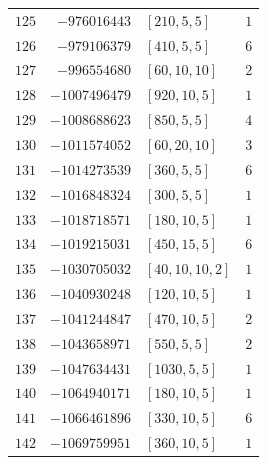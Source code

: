 \documentclass[11pt]{article}
\begin{document}
\begin{center}
\begin{longtable}{r r l c}
$125$ & $-976016443$ & $[210,5,5]$ & $1$\\
$126$ & $-979106379$ & $[410,5,5]$ & $6$\\
$127$ & $-996554680$ & $[60,10,10]$ & $2$\\
$128$ & $-1007496479$ & $[920,10,5]$ & $1$\\
$129$ & $-1008688623$ & $[850,5,5]$ & $4$\\
$130$ & $-1011574052$ & $[60,20,10]$ & $3$\\
$131$ & $-1014273539$ & $[360,5,5]$ & $6$\\
$132$ & $-1016848324$ & $[300,5,5]$ & $1$\\
$133$ & $-1018718571$ & $[180,10,5]$ & $1$\\
$134$ & $-1019215031$ & $[450,15,5]$ & $6$\\
$135$ & $-1030705032$ & $[40,10,10,2]$ & $1$\\
$136$ & $-1040930248$ & $[120,10,5]$ & $1$\\
$137$ & $-1041244847$ & $[470,10,5]$ & $2$\\
$138$ & $-1043658971$ & $[550,5,5]$ & $2$\\
$139$ & $-1047634431$ & $[1030,5,5]$ & $1$\\
$140$ & $-1064940171$ & $[180,10,5]$ & $1$\\
$141$ & $-1066461896$ & $[330,10,5]$ & $6$\\
$142$ & $-1069759951$ & $[360,10,5]$ & $1$\\
\end{longtable}
\end{center}
\end{document}
